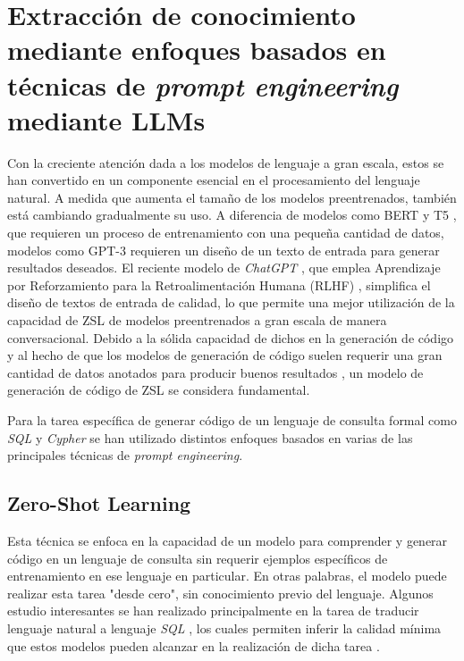 \section{Extracción de conocimiento mediante enfoques basados en técnicas de \textit{prompt engineering} mediante LLMs} \label{llm_approach}

Con la creciente atención dada a los modelos de lenguaje a gran escala, estos se han convertido en un componente esencial en el procesamiento del lenguaje natural. A medida que aumenta el tamaño de los modelos preentrenados, también está cambiando gradualmente su uso. A diferencia de modelos como BERT \cite{devlinetal2018} y T5 \cite{raffeletal2020}, que requieren un proceso de entrenamiento con una pequeña cantidad de datos, modelos como GPT-3 \cite{brownetal2020} requieren un diseño de un texto de entrada para generar resultados deseados. El reciente modelo de \textit{ChatGPT} \cite{chatgpt}, que emplea Aprendizaje por Reforzamiento para la Retroalimentación Humana (RLHF) \cite{christianoetal2021}, simplifica el diseño de textos de entrada de calidad, lo que permite una mejor utilización de la capacidad de ZSL de modelos preentrenados a gran escala de manera conversacional. Debido a la sólida capacidad de dichos en la generación de código \cite{llmcodegenerationsample} y al hecho de que los modelos de generación de código suelen requerir una gran cantidad de datos anotados para producir buenos resultados \cite{codegenmodeldataamount}, un modelo de generación de código de ZSL se considera fundamental.

Para la tarea específica de generar código de un lenguaje de consulta formal como \textit{SQL} y \textit{Cypher} se han utilizado distintos enfoques basados en varias de las principales técnicas de \textit{prompt engineering}.

\subsection{Zero-Shot Learning} \label{llm_approach_zsl}
	Esta técnica se enfoca en la capacidad de un modelo para comprender y generar código en un lenguaje de consulta sin requerir ejemplos específicos de entrenamiento en ese lenguaje en particular. En otras palabras, el modelo puede realizar esta tarea "desde cero", sin conocimiento previo del lenguaje. Algunos estudio interesantes se han realizado principalmente en la tarea de traducir lenguaje natural a lenguaje \textit{SQL} \cite{text2sqlzsl1} \cite{text2sqlzsl2}, los cuales permiten inferir la calidad mínima que estos modelos pueden alcanzar en la realización de dicha tarea \cite{zslislowerbound}.

